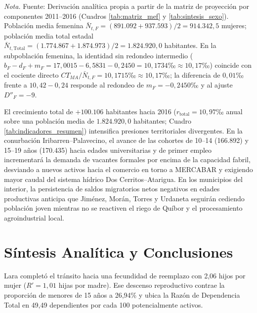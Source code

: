 \documentclass[12pt,letterpaper]{article}
\begin{document}
\begin{table}[htbp]
    \par\vspace{3pt}\noindent\raggedright \scriptsize \textit{Nota.} Fuente: Derivación analítica propia a partir de la matriz de proyección por componentes 2011--2016 (Cuadros \ref{tab:matriz_mef} y \ref{tab:sintesis_sexo}). Población media femenina $\bar{N}_{t,F} = (891.092 + 937.593)/2 = 914.342{,}5$ mujeres; población media total estadal $\bar{N}_{t,\text{Total}} = (1.774.867 + 1.874.973)/2 = 1.824.920{,}0$ habitantes. En la subpoblación femenina, la identidad sin redondeo intermedio ($b_F - d_F + m_F = 17{,}0015 - 6{,}5831 - 0{,}2450 = 10{,}1734\text{‰} \approx 10{,}17\text{‰}$) coincide con el cociente directo $CT_{MA}/\bar{N}_{t,F} = 10{,}1715\text{‰} \approx 10{,}17\text{‰}$; la diferencia de $0{,}01\text{‰}$ frente a $10{,}42 - 0{,}24$ responde al redondeo de $m_F = -0{,}2450\text{‰}$ y al ajuste $D''_F = -9$.
\end{table}

El crecimiento total de $+100.106$ habitantes hacia 2016 ($r_{\text{total}} = 10{,}97\text{‰}$ anual sobre una población media de $1.824.920{,}0$ habitantes; Cuadro \ref{tab:indicadores_resumen}) intensifica presiones territoriales divergentes. En la conurbación Iribarren--Palavecino, el avance de las cohortes de 10--14 (166.892) y 15--19 años (170.435) hacia edades universitarias y de primer empleo incrementará la demanda de vacantes formales por encima de la capacidad fabril, desviando a nuevos activos hacia el comercio en torno a MERCABAR y exigiendo mayor caudal del sistema hídrico Dos Cerritos--Atarigua. En los municipios del interior, la persistencia de saldos migratorios netos negativos en edades productivas anticipa que Jiménez, Morán, Torres y Urdaneta seguirán cediendo población joven mientras no se reactiven el riego de Quíbor y el procesamiento agroindustrial local.

\section{Síntesis Analítica y Conclusiones}

Lara completó el tránsito hacia una fecundidad de reemplazo con 2,06 hijos por mujer ($R' = 1,01$ hijas por madre). Ese descenso reproductivo contrae la proporción de menores de 15 años a 26,94\% y ubica la Razón de Dependencia Total en 49,49 dependientes por cada 100 potencialmente activos.
\end{document}
